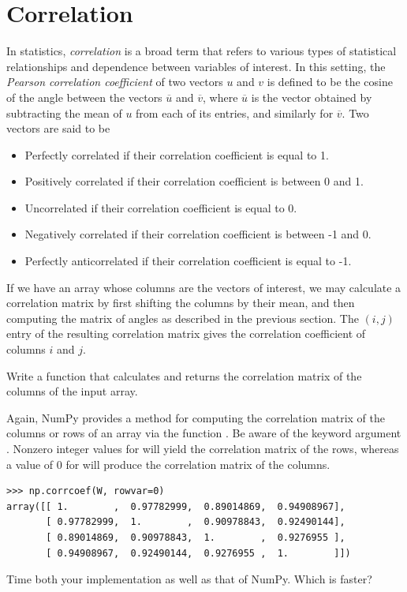 \section*{Correlation}
In statistics, \emph{correlation} is a broad term that refers to various types of statistical relationships and dependence between
variables of interest.
In this setting, the \emph{Pearson correlation coefficient} of two vectors $u$ and $v$ is defined to be the cosine of the angle between the
vectors $\overline{u}$ and $\overline{v}$, where $\overline{u}$ is the vector obtained by subtracting the mean of $u$ from each of its entries,
and similarly for $\overline{v}$.
Two vectors are said to be
\begin{itemize}
\item Perfectly correlated if their correlation coefficient is equal to 1.
\item Positively correlated if their correlation coefficient is between 0 and 1.
\item Uncorrelated if their correlation coefficient is equal to 0.
\item Negatively correlated if their correlation coefficient is between -1 and 0.
\item Perfectly anticorrelated if their correlation coefficient is equal to -1.
\end{itemize}

If we have an array whose columns are the vectors of interest, we may calculate a correlation matrix
by first shifting the columns by their mean, and then computing the matrix of angles as described in the
previous section. The $(i,j)$ entry of the resulting correlation matrix gives the correlation coefficient
of columns $i$ and $j$.

\begin{problem}
Write a function  that calculates and returns the correlation matrix of the columns of the input array.
\end{problem}
Again, NumPy provides a method for computing the correlation matrix of the columns or rows of an array via the function .
Be aware of the keyword argument .
Nonzero integer values for  will yield the correlation matrix of the rows, whereas a value of 0 for  will produce the correlation matrix of the columns.
\begin{lstlisting}
>>> np.corrcoef(W, rowvar=0)
array([[ 1.        ,  0.97782999,  0.89014869,  0.94908967],
       [ 0.97782999,  1.        ,  0.90978843,  0.92490144],
       [ 0.89014869,  0.90978843,  1.        ,  0.9276955 ],
       [ 0.94908967,  0.92490144,  0.9276955 ,  1.        ]])
\end{lstlisting}
Time both your implementation as well as that of NumPy. Which is faster?


